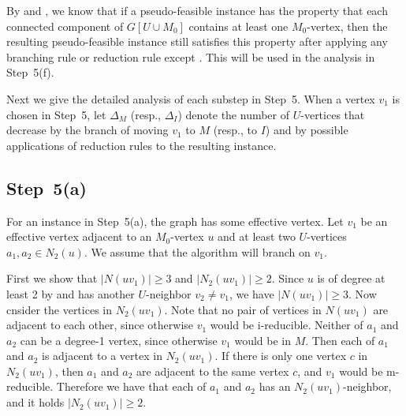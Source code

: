 \documentclass{elsart_TR2}
\begin{document}

By  and , we know that if a pseudo-feasible instance has the property that each connected component of $G[U\cup M_0]$ contains at least one $M_0$-vertex,
then the resulting pseudo-feasible instance still satisfies this property
after applying any branching rule or reduction rule except .
This will be used in the analysis in Step~5(f).

Next we give the detailed analysis of each substep  in Step~5.
When a vertex $v_1$ is chosen in Step~5,
let  $\Delta_M$ (resp., $\Delta_I$) denote the number   of
$U$-vertices that decrease by the branch of moving $v_1$ to $M$ (resp., to $I$)
and by possible applications of reduction rules to the resulting instance.


\subsection{Step~5(a)}
For an instance in Step~5(a),  the graph has some effective vertex.
Let $v_1$ be an effective vertex adjacent to an $M_0$-vertex $u$ and at least two $U$-vertices $a_1,a_2\in N_2(u)$.
We assume that the algorithm will branch on $v_1$.

First we show that $|N(uv_1)|\geq 3$ and $|N_2(uv_1)|\geq 2$.
Since $u$ is of degree at least 2 by  and has another $U$-neighbor $v_2 \neq v_1$, we have $|N(uv_1)|\geq 3$.
Now cnsider the vertices in $N_2(uv_1)$.
Note that no pair of vertices in $N(uv_1)$ are adjacent to each other,
since otherwise $v_1$ would be i-reducible.
Neither of $a_1$ and $a_2$ can be a degree-1 vertex, since otherwise $v_1$ would be in $M$.
Then each of $a_1$ and $a_2$ is adjacent to a vertex in $N_2(uv_1)$.
If there is only one vertex $c$ in  $N_2(uv_1)$, then
$a_1$ and $a_2$ are adjacent to the same vertex $c$, and $v_1$ would be m-reducible.
Therefore we have that each of $a_1$ and $a_2$  has  an $N_2(uv_1)$-neighbor,  and it holds $|N_2(uv_1)|\geq 2$.
\end{document}
